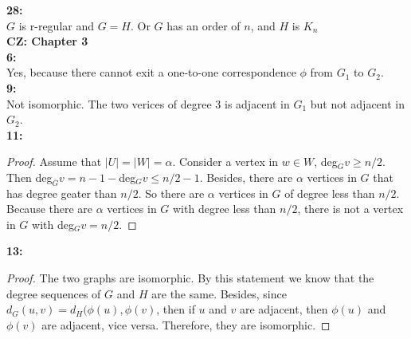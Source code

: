 \documentclass[11pt]{article}
\begin{document}
\textbf{28:}\\
$G$ is r-regular and $G=H$. Or $G$ has an order of $n$, and $H$ is $K_n$\\
\large\textbf{CZ: Chapter 3}\\
\normalsize\textbf{6:}\\
Yes, because there cannot exit a one-to-one correspondence $\phi$ from $G_1$ to $G_2$.\\
\textbf{9:}\\
Not isomorphic. The two verices of degree 3 is adjacent in $G_1$ but not adjacent in $G_2$.\\
\textbf{11:}
\begin{proof}
Assume that $|U|=|W|=\alpha$. Consider a vertex in $w\in W$, deg$_G v\ge n/2$. Then deg$_{\bar{G}} v=n-1-$deg$_Gv\le n/2-1$. Besides, there are $\alpha$ vertices in $G$ that has degree geater than $n/2$. So there are $\alpha$ vertices in $G$ of degree less than $n/2$. Because there are $\alpha$ vertices in $G$ with degree less than $n/2$, there is not a vertex in $G$ with deg$_Gv=n/2$. 
\end{proof}
\textbf{13:}
\begin{proof}
The two graphs are isomorphic. By  this statement we know that the degree sequences of $G$ and $H$ are the same. Besides, since $d_G(u,v)=d_H(\phi(u),\phi(v)$, then if $u$ and $v$ are adjacent, then $\phi(u)$ and $\phi(v)$ are adjacent, vice versa. Therefore, they are isomorphic.
\end{proof}
\end{document}
